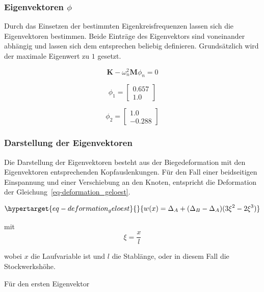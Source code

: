 \documentclass[
  letterpaper,
  DIV=11]{scrreprt}
\begin{document}
\hypertarget{eigenvektoren-phi-4}{%
\subsubsection{\texorpdfstring{Eigenvektoren
\(\phi\)}{Eigenvektoren \textbackslash phi}}\label{eigenvektoren-phi-4}}

Durch das Einsetzen der bestimmten Eigenkreisfrequenzen lassen sich die
Eigenvektoren bestimmen. Beide Einträge des Eigenvektors sind
voneinander abhängig und lassen sich dem entsprechen beliebig
definieren. Grundsätzlich wird der maximale Eigenwert zu \(1\) gesetzt.

\[\mathbf{K} - \omega_n^2 \mathbf{M} \phi_n= 0\]

\begin{equation}\phi_{1} = \left[\begin{matrix}0.657\\1.0\end{matrix}\right]\end{equation}

\begin{equation}\phi_{2} = \left[\begin{matrix}1.0\\-0.288\end{matrix}\right]\end{equation}

\hypertarget{darstellung-der-eigenvektoren}{%
\subsubsection{Darstellung der
Eigenvektoren}\label{darstellung-der-eigenvektoren}}

Die Darstellung der Eigenvektoren besteht aus der Biegedeformation mit
den Eigenvektoren entsprechenden Kopfauslenkungen. Für den Fall einer
beidseitigen Einspannung und einer Verschiebung an den Knoten,
entspricht die Deformation der Gleichung~\ref{eq-deformation_geloest}.

\begin{equation}\protect\hypertarget{eq-deformation_geloest}{}{
w(x) = \Delta_A + (\Delta_B- \Delta_A)(3\xi^2 - 2 \xi^3)
}\label{eq-deformation_geloest}\end{equation}

mit \[
\xi = \frac{x}{l}
\]

wobei \(x\) die Laufvariable ist und \(l\) die Stablänge, oder in diesem
Fall die Stockwerkshöhe.

Für den ersten Eigenvektor
\end{document}
